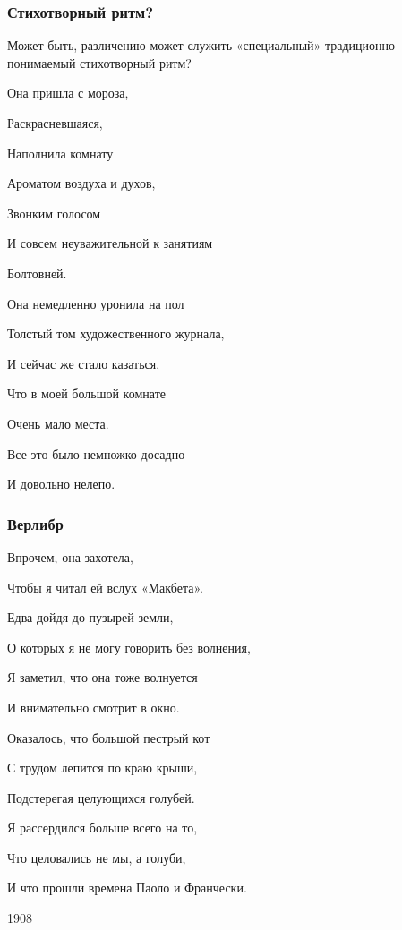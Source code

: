 \documentclass{beamer}
\begin{document}

\begin{frame}
\frametitle{Стихотворный ритм?}
\begin{flushleft}
Может быть, различению может служить «специальный» традиционно понимаемый стихотворный ритм?
\end{flushleft}
\par Она пришла с мороза,

Раскрасневшаяся,

Наполнила комнату

Ароматом воздуха и духов,

Звонким голосом

И совсем неуважительной к занятиям

Болтовней.

Она немедленно уронила на пол

Толстый том художественного журнала,

И сейчас же стало казаться,

Что в моей большой комнате

Очень мало места.

Все это было немножко досадно

И довольно нелепо.


\end{frame}


\begin{frame}
\frametitle{Верлибр}

Впрочем, она захотела,

Чтобы я читал ей вслух «Макбета».

Едва дойдя до пузырей земли,

О которых я не могу говорить без волнения,

Я заметил, что она тоже волнуется

И внимательно смотрит в окно.

Оказалось, что большой пестрый кот

С трудом лепится по краю крыши,

Подстерегая целующихся голубей.

Я рассердился больше всего на то,

Что целовались не мы, а голуби,

И что прошли времена Паоло и Франчески.

1908

\end{frame}
\end{document}
